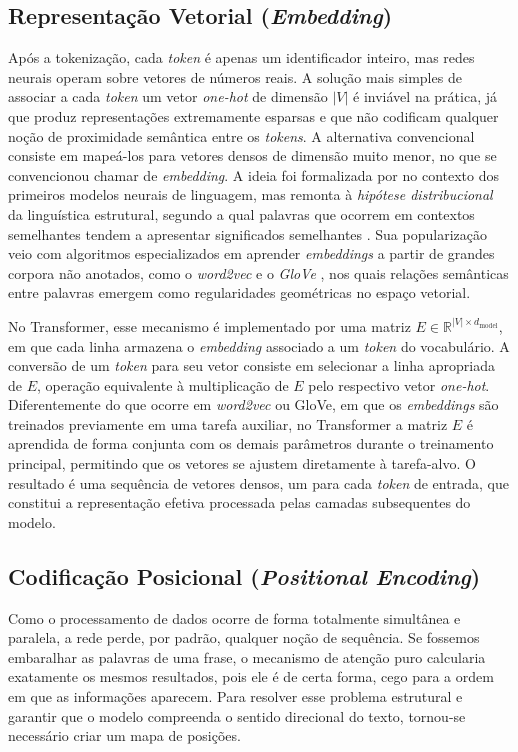 \subsection{Representação Vetorial (\textit{Embedding})}
Após a tokenização, cada \textit{token} é apenas um identificador inteiro, mas
redes neurais operam sobre vetores de números reais. A solução mais simples de associar a cada \textit{token} um vetor \textit{one-hot} de dimensão $|V|$ é inviável na prática, já que produz representações extremamente esparsas e que não codificam qualquer noção de proximidade
semântica entre os \textit{tokens}. A alternativa convencional consiste em mapeá-los para vetores densos de dimensão muito menor, no que se convencionou chamar de \textit{embedding}. A ideia foi formalizada por \cite{bengio2003neural} no contexto dos primeiros modelos neurais de linguagem, mas remonta à \textit{hipótese distribucional} da linguística estrutural, segundo a qual palavras que ocorrem em contextos semelhantes tendem a apresentar significados semelhantes
\citep{harris1954distributional, firth1957synopsis}. Sua popularização veio com algoritmos especializados em aprender \textit{embeddings} a partir de grandes corpora não anotados, como o \textit{word2vec} \cite{mikolov2013distributed} e o \textit{GloVe} \cite{pennington2014glove}, nos quais relações semânticas entre palavras emergem como regularidades geométricas no espaço vetorial.

No Transformer, esse mecanismo é implementado por uma matriz $E \in \mathbb{R}^{|V| \times d_{\text{model}}}$, em que cada linha armazena o \textit{embedding} associado a um \textit{token} do vocabulário. A conversão de um \textit{token} para seu vetor consiste em selecionar a
linha apropriada de $E$, operação equivalente à multiplicação de $E$ pelo respectivo vetor \textit{one-hot}. Diferentemente do que ocorre em \textit{word2vec} ou GloVe, em que os \textit{embeddings} são treinados previamente em uma tarefa auxiliar, no Transformer a matriz $E$ é
aprendida de forma conjunta com os demais parâmetros durante o treinamento principal, permitindo que os vetores se ajustem diretamente à tarefa-alvo. O resultado é uma sequência de vetores densos, um para cada \textit{token} de entrada, que constitui a representação efetiva
processada pelas camadas subsequentes do modelo.



\subsection{Codificação Posicional (\textit{Positional Encoding})}
Como o processamento de dados ocorre de forma totalmente simultânea e paralela, a rede perde, por padrão, qualquer noção de sequência. Se fossemos embaralhar as palavras de uma frase, o mecanismo de atenção puro calcularia exatamente os mesmos resultados, pois ele é de certa forma, cego para a ordem em que as informações aparecem. Para resolver esse problema estrutural e garantir que o modelo compreenda o sentido direcional do texto, tornou-se necessário criar um mapa de posições.

